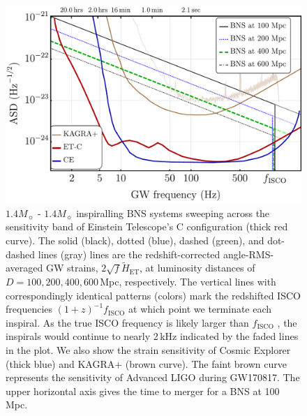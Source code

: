 \documentclass{aa}
\begin{document}
\begin{figure}
\sidecaption
\includegraphics[width=12cm]{../Figs/ET_strains_redshifted_v2.pdf}
\caption{%
$1.4 M_\sun$ - $1.4 M_\sun$ inspiralling BNS systems sweeping across the sensitivity band of Einstein Telescope's C configuration (thick red curve).
The solid (black), dotted (blue), dashed (green), and dot-dashed lines (gray) lines are the redshift-corrected
angle-RMS-averaged GW strains, $2\sqrt{f}\tilde{H}_\text{ET}$, at luminosity distances of $D=100, 200, 400, 600\,$Mpc, respectively. 
The vertical lines with correspondingly identical patterns (colors) mark the redshifted ISCO frequencies $(1+z)^{-1} f_\text{ISCO}$ at which point we terminate each inspiral.
As the true ISCO frequency is likely larger than $f_\text{ISCO}$ \citep{Marronetti:2003hx}, the inspirals would continue to nearly 2\,kHz indicated by the faded lines in the plot.
We also show the strain sensitivity of Cosmic Explorer (thick blue) and KAGRA+ (brown curve).
The faint brown curve represents the sensitivity of Advanced LIGO during GW170817.
The upper  horizontal axis gives the time to merger for a BNS at 100 Mpc.
}
\label{fig:ETB2030}
\end{figure}
%
%
%
\end{document}
